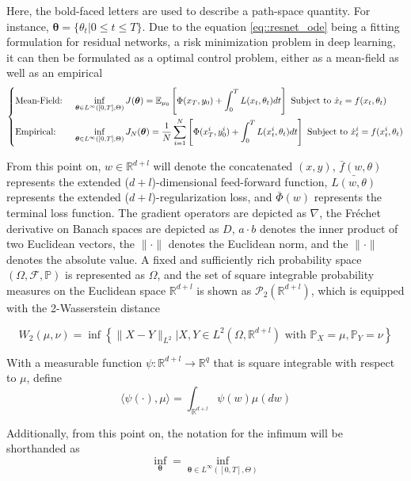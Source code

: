 Here, the bold-faced letters are used to describe a path-space quantity. For instance, $\bm{\theta} = \{ \theta_t | 0 \leq t \leq T \}$. Due to the equation \ref{eq::resnet_ode} being a fitting formulation for residual networks, a risk minimization problem in deep learning, it can then be formulated as a optimal control problem, either as a mean-field as well as an empirical
\begin{equation*}
\begin{dcases}
\text{Mean-Field: } & \inf_{\bm{\theta} \in L^{\infty} ([0,T], \Theta)} J(\bm{\theta}) = \mathbb{E}_{\mu_0} \left[ \Phi (x_T,y_0) + \int_0^T L(x_t,\theta_t) dt \right]  \text{   Subject to } \dot{x}_t = f(x_t,\theta_t) \\
\text{Empirical: }  & \inf_{\bm{\theta} \in L^{\infty} ([0,T], \Theta)} J_N(\bm{\theta}) = \frac{1}{N} \sum_{i=1}^N \left[ \Phi (x_T^i,y_0^i) + \int_0^T L(x_t^i,\theta_t) dt \right] \text{   Subject to } \dot{x}^i_t = f(x_t^i,\theta_t) \\
\end{dcases}
\end{equation*}

From this point on, $w \in \mathbb{R}^{d+l}$ will denote the concatenated $(x,y)$, $\bar{f}(w,\theta)$ represents the extended ($d+l$)-dimensional feed-forward function, $\bar{L(w,\theta)}$ represents the extended ($d+l$)-regularization loss, and $\bar{\Phi}(w)$ represents the terminal loss function. The gradient operators are depicted as $\nabla$, the Fréchet derivative on Banach spaces are depicted as $D$, $a\cdot b$ denotes the inner product of two Euclidean vectors, the $\| \cdot \|$ denotes the Euclidean norm, and the $\| \cdot \|$ denotes the absolute value. A fixed and sufficiently rich probability space $(\Omega, \mathcal{F}, \mathbb{P})$ is represented as $\Omega$, and the set of square integrable probability measures on the Euclidean space $\mathbb{R}^{d+l}$ is shown as $\mathcal{P}_2(\mathbb{R}^{d+l})$, which is equipped with the 2-Wasserstein distance

$$W_2(\mu,\nu) = \inf \left\{  \| X - Y \| _{L^2} | X,Y \in L^{2}(\Omega,\mathbb{R}^{d+l}) \text{ with } \mathbb{P}_X = \mu , \mathbb{P}_Y = \nu \right\}$$

With a measurable function $\psi : \mathbb{R}^{d+l} \rightarrow \mathbb{R}^q$ that is square integrable with respect to $\mu$, define
$$\langle \psi(\cdot) , \mu \rangle = \int_{\mathbb{R}^{d+l}} \psi(w) \mu(dw)$$

Additionally, from this point on, the notation for the infimum will be shorthanded as
$$ \inf_{\bm{\theta}} = \inf_{\bm{\theta} \in L^{\infty}([0,T],\Theta)}$$

